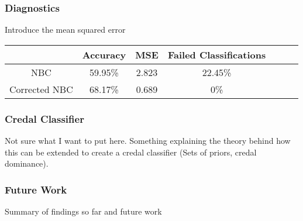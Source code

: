 \documentclass{beamer}
\begin{document}
\begin{frame}
	\frametitle{Diagnostics}
	Introduce the mean squared error
	\begin{tabular}{ c|c c c c c c }
		              & Accuracy & MSE   & Failed Classifications \\
		\hline
		NBC           & 59.95\%  & 2.823 & 22.45\%                \\
		Corrected NBC & 68.17\%  & 0.689 & 0\%
	\end{tabular}
\end{frame}

\begin{frame}
	\frametitle{Credal Classifier}
	Not sure what I want to put here. Something explaining the theory behind how this can be extended to create a credal classifier (Sets of priors, credal dominance).
\end{frame}

\begin{frame}
	\frametitle{Future Work}
	Summary of findings so far and future work
\end{frame}
 
\end{document}
